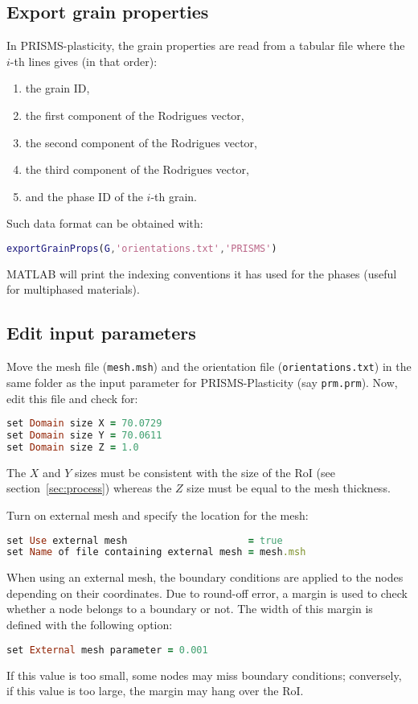 \documentclass[a4paper]{scrartcl}
\newcommand{\matlab}{MATLAB\textsuperscript{\textregistered}}
\begin{document}
	\subsection{Export grain properties}
	In PRISMS-plasticity, the grain properties are read from a tabular file where the $i$-th lines gives (in that order):
	\begin{enumerate}
	\item the grain ID,
	\item the first component of the Rodrigues vector,
	\item the second component of the Rodrigues vector,
	\item the third component of the Rodrigues vector,
	\item and the phase ID of the $i$-th grain.
	\end{enumerate}
	Such data format can be obtained with:
	\begin{lstlisting}[language=Matlab]
exportGrainProps(G,'orientations.txt','PRISMS')
	\end{lstlisting}
\matlab{} will print the indexing conventions it has used for the phases (useful for multiphased materials). 


	
	\subsection{Edit input parameters}
	\label{sec:param}	Move the mesh file (\texttt{mesh.msh}) and the orientation file (\texttt{orientations.txt}) in the same folder as the input parameter for PRISMS-Plasticity (say \texttt{prm.prm}). Now, edit this file and check for:
	\begin{lstlisting}[language=ruby]
set Domain size X = 70.0729
set Domain size Y = 70.0611
set Domain size Z = 1.0
	\end{lstlisting}
The $X$ and $Y$ sizes must be consistent with the size of the RoI (see section~\ref{sec:process}) whereas the $Z$ size must be equal to the mesh thickness.

Turn on external mesh and specify the location for the mesh:
\begin{lstlisting}[language=ruby]
set Use external mesh                     = true
set Name of file containing external mesh = mesh.msh
\end{lstlisting}

When using an external mesh, the boundary conditions are applied to the nodes depending on their coordinates. Due to round-off error, a margin is used to check whether a node belongs to a boundary or not. The width of this margin is defined with the following option:
\begin{lstlisting}[language=ruby]
set External mesh parameter = 0.001
\end{lstlisting}
If this value is too small, some nodes may miss boundary conditions; conversely, if this value is too large, the margin may hang over the RoI.
\end{document}
